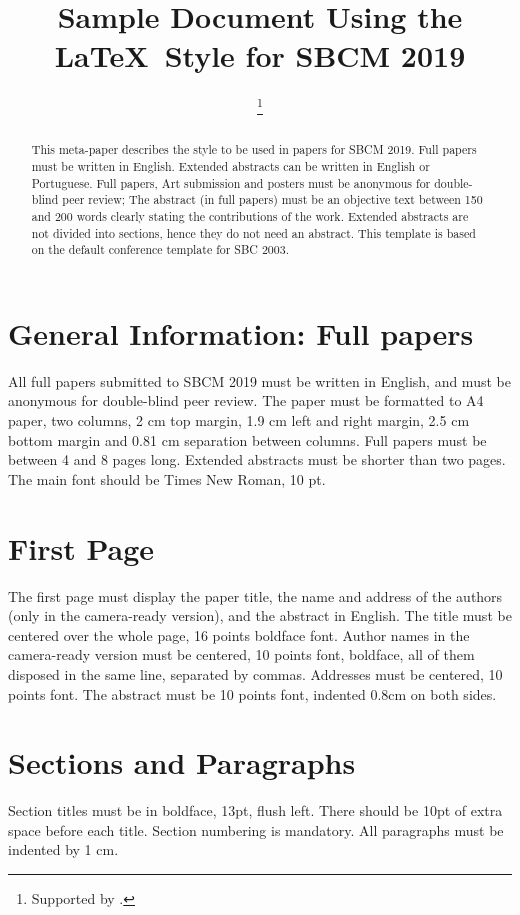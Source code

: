 \documentclass[10pt,times,twocolumn]{article}
\title{Sample Document Using the \LaTeX\ Style for SBCM 2019}
\author{\anonymize{First Author}\inst{1}\thanks{Supported by \anonymize{CAPES}.} \and
        \anonymize{Second Author}\inst{1}\inst{2}}
\begin{document}
\maketitle

\begin{abstract}
This meta-paper describes the style to be used in papers for SBCM 2019.
Full papers must be written in English. Extended abstracts can be written in English or Portuguese.
Full papers, Art submission and posters must be anonymous for double-blind peer review; The abstract (in full papers) must be an objective text between 150 and 200 words clearly stating the contributions of the work.
Extended abstracts are not divided into sections, hence they do not need an abstract.
This template is based on the default conference template for SBC 2003.
\end{abstract}


\section{General Information: Full papers}\label{sec:gen}

All full papers submitted to SBCM 2019 must be written in English, and must be anonymous for double-blind peer review. The paper must be formatted to A4 paper, two columns, 2 cm top margin, 1.9 cm left and right
margin, 2.5 cm bottom margin and 0.81 cm separation between columns. Full papers must be between 4 and 8 pages long. Extended abstracts must be shorter than two pages. The main font should be Times New Roman, 10 pt.

\section{First Page}

The first page must display the paper title, the name and address of the authors (only in the camera-ready version), and the abstract in English. The title must be centered over the whole page, 16 points boldface font. Author names in the camera-ready version must be centered, 10 points font, boldface, all of them disposed in the same line, separated by commas. Addresses must be centered, 10 points font.
The abstract must be 10 points font, indented 0.8cm on both sides.

\section{Sections and Paragraphs}
Section titles must be in boldface, 13pt, flush left. There should be 10pt of extra space before each title. Section numbering is mandatory. All paragraphs must be indented by 1 cm.
\end{document}
